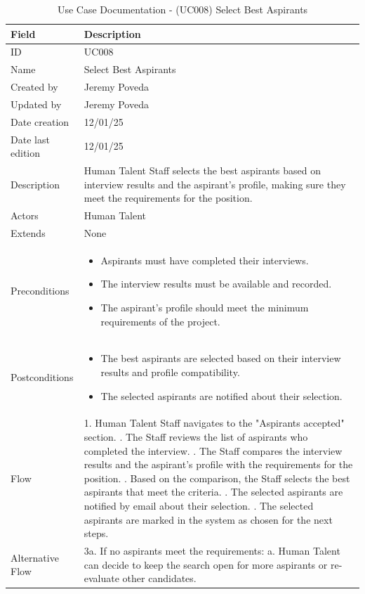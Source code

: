 \documentclass{scrreprt}
\begin{document}
\begin{table}[H]
	\centering
	\begin{tabular}{|p{3cm}|p{10cm}|}
		\hline
		\textbf{Field} & \textbf{Description} \\ \hline
		ID & UC008 \\ \hline
		Name & Select Best Aspirants \\ \hline
		Created by & Jeremy Poveda \\ \hline
		Updated by & Jeremy Poveda \\ \hline
		Date creation & 12/01/25 \\ \hline
		Date last edition & 12/01/25 \\ \hline
		Description & Human Talent Staff selects the best aspirants based on interview results and the aspirant’s profile, making sure they meet the requirements for the position. \\ \hline
		Actors & Human Talent \\ \hline
		Extends & None \\ \hline
		Preconditions & 
		\begin{itemize}
			\item Aspirants must have completed their interviews.
			\item The interview results must be available and recorded.
			\item The aspirant’s profile should meet the minimum requirements of the project.
		\end{itemize} \\ \hline
		Postconditions & 
		\begin{itemize}
			\item The best aspirants are selected based on their interview results and profile compatibility.
			\item The selected aspirants are notified about their selection.
		\end{itemize} \\ \hline
		Flow & 
		1. Human Talent Staff navigates to the "Aspirants accepted" section. \newline
		2. The Staff reviews the list of aspirants who completed the interview. \newline
		3. The Staff compares the interview results and the aspirant’s profile with the requirements for the position. \newline
		4. Based on the comparison, the Staff selects the best aspirants that meet the criteria. \newline
		5. The selected aspirants are notified by email about their selection. \newline
		6. The selected aspirants are marked in the system as chosen for the next steps. \\ \hline
		Alternative Flow & 
		3a. If no aspirants meet the requirements: \newline
		\hspace*{0.5cm} a. Human Talent can decide to keep the search open for more aspirants or re-evaluate other candidates. \\ \hline
	\end{tabular}
	\caption{Use Case Documentation - (UC008) Select Best Aspirants}
	\label{table:UC008}
\end{table}
\end{document}
